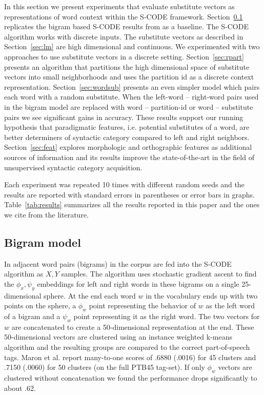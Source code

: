 In this section we present experiments that evaluate substitute
vectors as representations of word context within the S-CODE
framework.  Section~\ref{sec:bigram} replicates the bigram based
S-CODE results from \cite{maron2010sphere} as a baseline.  The S-CODE
algorithm works with discrete inputs.  The substitute vectors as
described in Section~\ref{sec:lm} are high dimensional and continuous.
We experimented with two approaches to use substitute vectors in a
discrete setting.  Section~\ref{sec:rpart} presents an algorithm that
partitions the high dimensional space of substitute vectors into small
neighborhoods and uses the partition id as a discrete context
representation.  Section~\ref{sec:wordsub} presents an even simpler
model which pairs each word with a random substitute.  When the
left-word -- right-word pairs used in the bigram model are replaced
with word -- partition-id or word -- substitute pairs we see
significant gains in accuracy.  These results support our running
hypothesis that paradigmatic features, i.e. potential substitutes of a
word, are better determiners of syntactic category compared to left
and right neighbors.  Section~\ref{sec:feat} explores morphologic and
orthographic features as additional sources of information and its
results improve the state-of-the-art in the field of unsupervised
syntactic category acquisition.

Each experiment was repeated 10 times with different random seeds and
the results are reported with standard errors in parentheses or error
bars in graphs.  Table~\ref{tab:results} summarizes all the results
reported in this paper and the ones we cite from the literature.

\subsection{Bigram model}\label{sec:bigram}

In \cite{maron2010sphere} adjacent word pairs (bigrams) in the corpus
are fed into the S-CODE algorithm as $X, Y$ samples.  The algorithm
uses stochastic gradient ascent to find the $\phi_x, \psi_y$
embeddings for left and right words in these bigrams on a single
25-dimensional sphere.  At the end each word $w$ in the vocabulary
ends up with two points on the sphere, a $\phi_w$ point representing
the behavior of $w$ as the left word of a bigram and a $\psi_w$ point
representing it as the right word.  The two vectors for $w$ are
concatenated to create a 50-dimensional representation at the end.
These 50-dimensional vectors are clustered using an instance weighted
k-means algorithm and the resulting groups are compared to the correct
part-of-speech tags.  Maron et al.  report
many-to-one scores of .6880 (.0016) for 45 clusters and .7150 (.0060)
for 50 clusters (on the full PTB45 tag-set).  If only $\phi_w$ vectors
are clustered without concatenation we found the performance drops
significantly to about .62.

